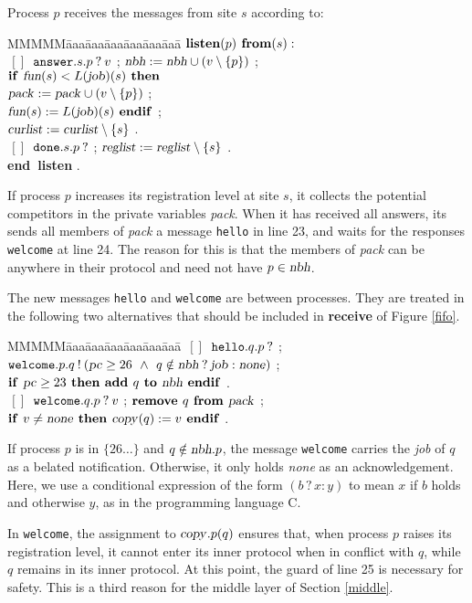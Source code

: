 \documentclass[10pt]{article} \usepackage[english]{babel}
\newenvironment{tab}{\begin{tabbing}
MMMMM\=aaa\=aaa\=aaa\=aaa\=aaa\=aaa\= \kill}{\end{tabbing}}
\def\bar   {\mbox{$\,[ \! ]\,$}}
\def\S #1/{\mbox {\textsl{#1}}}
\def\B #1/{\mbox {\textbf{#1}}}
\def\T #1/{\mbox {\texttt{#1}}}
\def\Land   {\mbox{ $\;\land\;$ }}
\begin{document}
Process $p$ receives the messages from site $s$ according to:
\begin{tab}
\>\+\+ $ \B listen/(p)\B\ from/(s): $ \\
$ \bar $ \> $ \T answer/.s.p\:?\: v$ ; 
 $ \S nbh/:=\S nbh/\cup(v\setminus \{p\}) $ ;\\
\> $ \B if /\S fun/(s) < L(\S job/)(s) \B\ then/ $ \\
\>\>  $ \S pack/:=\S pack/\cup(v\setminus \{p\}) $ ;\\
\>\> $ \S fun/(s) := L(\S job/)(s) \B\ endif/ $ ;\\
\> $ \S curlist/ := \S curlist/\setminus \{s\} $ .\\
$ \bar $ \> $ \T done/.s.p\:? $ ; 
$ \S reglist/ := \S reglist/\setminus \{s\} $ .\-\\
\B end listen/ .
\end{tab}
If process $p$ increases its registration level at site $s$, it
collects the potential competitors in the private variables \S pack/.
When it has received all answers, its sends all members of \S pack/ a
message \T hello/ in line 23, and waits for the responses \T welcome/
at line 24.  The reason for this is that the members of \S pack/ can
be anywhere in their protocol and need not have $p \in \S nbh/$.

The new messages \T hello/ and \T welcome/ are between processes.
They are treated in the following two alternatives that should be
included in \B receive/ of Figure \ref{fifo}.
\begin{tab}
\>\+ $ \bar $ \> $ \T hello/.q.p\:? $ ; \\
\> $ \T welcome/.p.q\:!\:(\S pc/ \geq 26 \Land q\notin \S nbh/\:?\:
\S job/ : \S none/) $ ;\\
\> $ \B if / \S pc/\geq 23\B\ then /
\B add /q\B\ to /\S nbh/\B\ endif/ $ .\\
$ \bar $ \> $ \T welcome/.q.p\:?\: v $ ; $ \B remove /q\B\ from /\S pack/$ ;\\
\> $ \B if /v\ne\S none/\B\ then / \S copy/(q) := v\B\ endif/ $ .
\end{tab}
If process $p$ is in $\{26\dots\}$ and $q\notin\S nbh/.p$, the message
\T welcome/ carries the \S job/ of $q$ as a belated notification.
Otherwise, it only holds \S none/ as an acknowledgement.  Here, we use
a conditional expression of the form $(b\,?\,x:y)$ to mean $x$ if $b$
holds and otherwise $y$, as in the programming language C.

In \T welcome/, the assignment to $\S copy/.p(q)$ ensures that, when
process $p$ raises its registration level, it cannot enter its inner
protocol when in conflict with $q$, while $q$ remains in its inner
protocol.  At this point, the guard of line 25 is necessary for
safety.  This is a third reason for the middle layer of Section
\ref{middle}.
\end{document}
